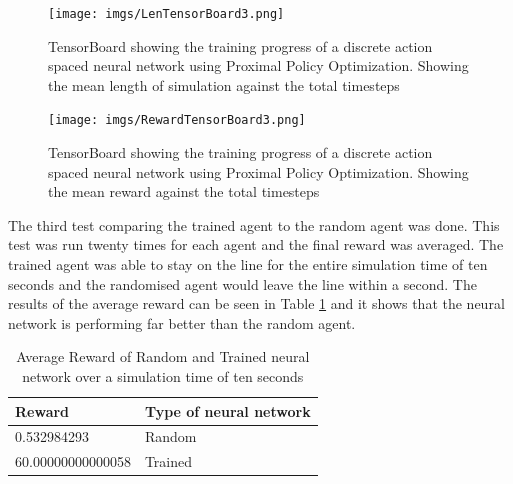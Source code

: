 \documentclass[a4paper,12pt]{article}
\begin{document}
\begin{figure}[H]
\centering
\texttt{[image: imgs/LenTensorBoard3.png]}
\caption{TensorBoard showing the training progress of a discrete action spaced neural network using Proximal Policy Optimization. Showing the mean length of simulation against the total timesteps }
\label{fig:LenTensorBoard3}
\end{figure}
\begin{figure}[H]
\centering
\texttt{[image: imgs/RewardTensorBoard3.png]}
\caption{TensorBoard showing the training progress of a discrete action spaced neural network using Proximal Policy Optimization. Showing the mean reward against the total timesteps }
\label{fig:RewardTensorBoard3}
\end{figure}

\noindent
The third test comparing the trained agent to the random agent was done. This test was run twenty times for each agent and the final reward was averaged. The trained agent was able to stay on the line for the entire simulation time of ten seconds and the randomised agent would leave the line within a second. The results of the average reward can be seen in Table \ref{tab:AverageReward} and it shows that the neural network is performing far better than the random agent. 

\begin{table}[H]
\centering
\caption{Average Reward of Random and Trained neural network over a simulation time of ten seconds}
\label{tab:AverageReward}
\begin{tabular}{|ll|}
\hline
\textbf{Reward} & \textbf{Type of neural network}\\ \hline
0.532984293 & Random \\
60.00000000000058 & Trained \\
\hline
\end{tabular}
\end{table}
\end{document}
